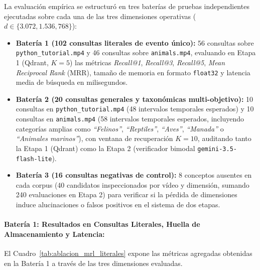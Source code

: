 La evaluación empírica se estructuró en tres baterías de pruebas independientes ejecutadas sobre cada una de las tres dimensiones operativas ($d \in \{3.072, 1.536, 768\}$):
\begin{itemize}
    \item \textbf{Batería 1 (102 consultas literales de evento único):} 56 consultas sobre \texttt{python\_tutorial.mp4} y 46 consultas sobre \texttt{animals.mp4}, evaluando en Etapa 1 (Qdrant, $K=5$) las métricas \textit{Recall@1}, \textit{Recall@3}, \textit{Recall@5}, \textit{Mean Reciprocal Rank} (MRR), tamaño de memoria en formato \texttt{float32} y latencia media de búsqueda en milisegundos.
    \item \textbf{Batería 2 (20 consultas generales y taxonómicas multi-objetivo):} 10 consultas en \texttt{python\_tutorial.mp4} (48 intervalos temporales esperados) y 10 consultas en \texttt{animals.mp4} (58 intervalos temporales esperados, incluyendo categorías amplias como \textit{``Felinos''}, \textit{``Reptiles''}, \textit{``Aves''}, \textit{``Manada''} o \textit{``Animales marinos''}), con ventana de recuperación $K=10$, auditando tanto la Etapa 1 (Qdrant) como la Etapa 2 (verificador bimodal \texttt{gemini-3.5-flash-lite}).
    \item \textbf{Batería 3 (16 consultas negativas de control):} 8 conceptos ausentes en cada corpus (40 candidatos inspeccionados por vídeo y dimensión, sumando 240 evaluaciones en Etapa 2) para verificar si la pérdida de dimensiones induce alucinaciones o falsos positivos en el sistema de dos etapas.
\end{itemize}

\paragraph{Batería 1: Resultados en Consultas Literales, Huella de Almacenamiento y Latencia:}
El Cuadro~\ref{tab:ablacion_mrl_literales} expone las métricas agregadas obtenidas en la Batería 1 a través de las tres dimensiones evaluadas.

